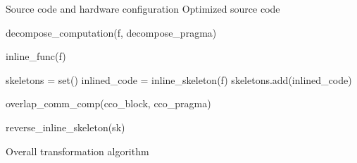 %
%
%
%
%
%
%

\begin{algorithm}
{\scriptsize
\begin{algorithmic}
\Require Source code and hardware configuration
\Ensure Optimized source code

    \State decompose\_computation(f, decompose\_pragma)
  \EndFor

    \State inline\_func(f)
  \EndFor

  \State skeletons = set()
    \State inlined\_code = inline\_skeleton(f)
    \State skeletons.add(inlined\_code)
  \EndFor

  \State overlap\_comm\_comp(cco\_block, cco\_pragma)

    \State reverse\_inline\_skeleton(sk)
  \EndFor
\EndFor

\end{algorithmic}
\caption{Overall transformation algorithm}
\label{alg:workflow}
}%
\end{algorithm}

